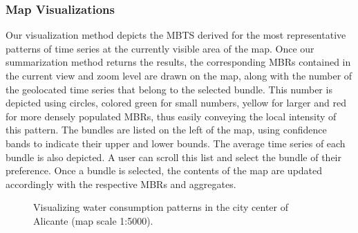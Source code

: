 \subsubsection{Map Visualizations}
\label{subsec:btsr_exp}

Our visualization method depicts the MBTS derived for the most representative patterns of time series at the currently visible area of the map. Once our summarization method returns the results, the corresponding MBRs contained in the current view and zoom level are drawn on the map, along with the number of the geolocated time series that belong to the selected bundle. This number is depicted using circles, colored green for small numbers, yellow for larger and red for more densely populated MBRs, thus easily conveying the local intensity of this pattern. The bundles are listed on the left of the map, using confidence bands to indicate their upper and lower bounds. The average time series of each bundle is also depicted. A user can scroll this list and select the bundle of their preference. Once a bundle is selected, the contents of the map are updated accordingly with the respective MBRs and aggregates.

\begin{figure}[ht]
 \centering
 \caption{Visualizing water consumption patterns in the city center of Alicante (map scale 1:5000).}
 \label{fig:alicante_example}
\end{figure}


